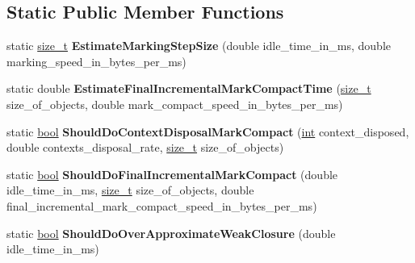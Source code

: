 \subsection*{Static Public Member Functions}
\begin{DoxyCompactItemize}
\item 
\mbox{\label{classv8_1_1internal_1_1GCIdleTimeHandler_a8f4bea1cd70f253107bee82834ebf73d}} 
static \mbox{\hyperlink{classsize__t}{size\+\_\+t}} {\bfseries Estimate\+Marking\+Step\+Size} (double idle\+\_\+time\+\_\+in\+\_\+ms, double marking\+\_\+speed\+\_\+in\+\_\+bytes\+\_\+per\+\_\+ms)
\item 
\mbox{\label{classv8_1_1internal_1_1GCIdleTimeHandler_a848df7d9be920880d7dc4585ca7f5642}} 
static double {\bfseries Estimate\+Final\+Incremental\+Mark\+Compact\+Time} (\mbox{\hyperlink{classsize__t}{size\+\_\+t}} size\+\_\+of\+\_\+objects, double mark\+\_\+compact\+\_\+speed\+\_\+in\+\_\+bytes\+\_\+per\+\_\+ms)
\item 
\mbox{\label{classv8_1_1internal_1_1GCIdleTimeHandler_addcad145a97bb390eb5aa2f6e7abd285}} 
static \mbox{\hyperlink{classbool}{bool}} {\bfseries Should\+Do\+Context\+Disposal\+Mark\+Compact} (\mbox{\hyperlink{classint}{int}} context\+\_\+disposed, double contexts\+\_\+disposal\+\_\+rate, \mbox{\hyperlink{classsize__t}{size\+\_\+t}} size\+\_\+of\+\_\+objects)
\item 
\mbox{\label{classv8_1_1internal_1_1GCIdleTimeHandler_ae1c8b3b8cc189a68f2e58edb3856171a}} 
static \mbox{\hyperlink{classbool}{bool}} {\bfseries Should\+Do\+Final\+Incremental\+Mark\+Compact} (double idle\+\_\+time\+\_\+in\+\_\+ms, \mbox{\hyperlink{classsize__t}{size\+\_\+t}} size\+\_\+of\+\_\+objects, double final\+\_\+incremental\+\_\+mark\+\_\+compact\+\_\+speed\+\_\+in\+\_\+bytes\+\_\+per\+\_\+ms)
\item 
\mbox{\label{classv8_1_1internal_1_1GCIdleTimeHandler_a1fef31ad290f57911bf56f6376703e3c}} 
static \mbox{\hyperlink{classbool}{bool}} {\bfseries Should\+Do\+Over\+Approximate\+Weak\+Closure} (double idle\+\_\+time\+\_\+in\+\_\+ms)
\end{DoxyCompactItemize}
